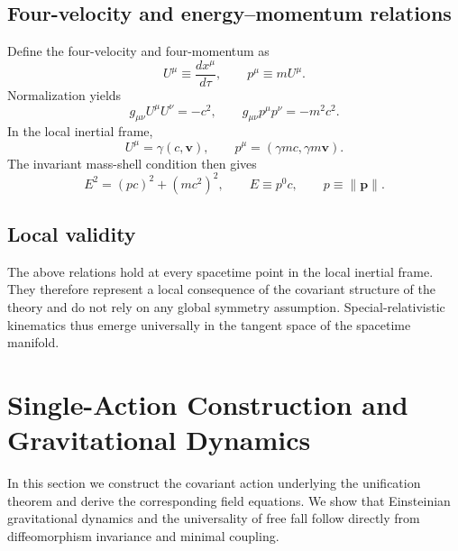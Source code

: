 \documentclass[11pt]{article}
\begin{document}
    \subsection{Four-velocity and energy--momentum relations}

        Define the four-velocity and four-momentum as
        \begin{equation}
            U^\mu \equiv \frac{dx^\mu}{d\tau}, \qquad
            p^\mu \equiv m U^\mu .
        \end{equation}
        Normalization yields
        \begin{equation}
            g_{\mu\nu} U^\mu U^\nu = -c^2, \qquad
            g_{\mu\nu} p^\mu p^\nu = -m^2 c^2 .
        \end{equation}
        In the local inertial frame,
        \begin{equation}
            U^\mu = \gamma (c,\mathbf{v}), \qquad
            p^\mu = (\gamma m c, \gamma m \mathbf{v}) .
        \end{equation}
        The invariant mass-shell condition then gives
        \begin{equation}
            E^2 = (pc)^2 + (mc^2)^2,
            \qquad
            E \equiv p^0 c,
            \qquad
            p \equiv \lVert \mathbf{p} \rVert .
        \end{equation}

    \subsection{Local validity}

        The above relations hold at every spacetime point in the local inertial frame.
        They therefore represent a local consequence of the covariant structure of the
        theory and do not rely on any global symmetry assumption.
        Special-relativistic kinematics thus emerge universally in the tangent space of
        the spacetime manifold.

    \section{Single-Action Construction and Gravitational Dynamics}
    \label{sec:single-action}

    In this section we construct the covariant action underlying the unification
    theorem and derive the corresponding field equations.
    We show that Einsteinian gravitational dynamics and the universality of free
    fall follow directly from diffeomorphism invariance and minimal coupling.
\end{document}
